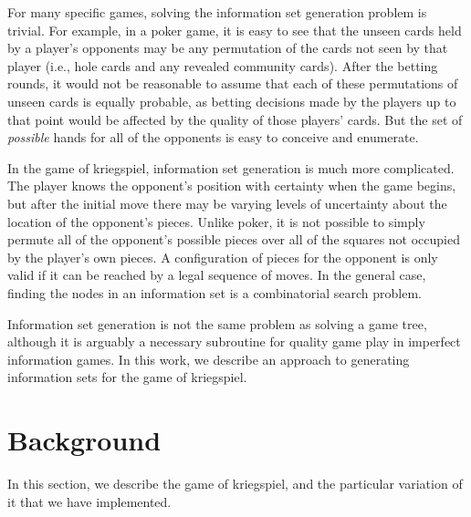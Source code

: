 \documentclass[11pt]{article}
\begin{document}
For many specific games, solving the information set generation problem is trivial.  For example, in a poker game, it is easy to
see that the unseen cards held by a player's opponents may be any permutation of the cards not seen by that player
(i.e., hole cards and any revealed community cards).  After the betting rounds, it would not be reasonable to assume
that each of these permutations of unseen cards is equally probable, as betting decisions made by the players up to that
point would be affected by the quality of those players' cards.  But the set of {\em possible} hands for all of the
opponents is easy to conceive and enumerate.

In the game of kriegspiel, information set generation is much more complicated.  The player knows the opponent's position with
certainty when the game begins, but after the initial move there may be varying levels of uncertainty about the location
of the opponent's pieces.  Unlike poker, it is not possible to simply permute all of the opponent's possible pieces over
all of the squares not occupied by the player's own pieces.  A configuration of pieces for the opponent is only valid if
it can be reached by a legal sequence of moves.  In the general case, finding the nodes in an information set is a
combinatorial search problem.

Information set generation is not the same problem as solving a game tree, although it is arguably a necessary
subroutine for quality game play in imperfect information games.  In this work, we describe an approach to generating
information sets for the game of kriegspiel. 

\section{Background}
In this section, we describe the game of kriegspiel, and the particular variation of it that we have implemented.
\end{document}
